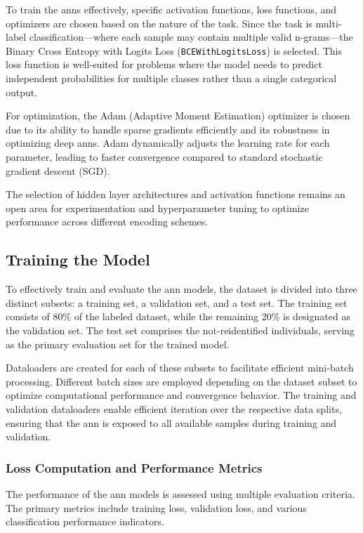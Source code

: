 To train the \ac{ann}s effectively, specific activation functions, loss functions, and optimizers are chosen based on the nature of the task.
Since the task is multi-label classification—where each sample may contain multiple valid n-grams—the Binary Cross Entropy with Logits Loss (\texttt{BCEWithLogitsLoss}) is selected.
This loss function is well-suited for problems where the model needs to predict independent probabilities for multiple classes rather than a single categorical output.

For optimization, the Adam (Adaptive Moment Estimation) optimizer is chosen due to its ability to handle sparse gradients efficiently and its robustness in optimizing deep \ac{ann}s.
Adam dynamically adjusts the learning rate for each parameter, leading to faster convergence compared to standard stochastic gradient descent (SGD).

The selection of hidden layer architectures and activation functions remains an open area for experimentation and hyperparameter tuning to optimize performance across different encoding schemes.

\subsection{Training the Model} \label{sec:training}

To effectively train and evaluate the \ac{ann} models, the dataset is divided into three distinct subsets: a training set, a validation set, and a test set.
The training set consists of 80\% of the labeled dataset, while the remaining 20\% is designated as the validation set.
The test set comprises the not-reidentified individuals, serving as the primary evaluation set for the trained model.

Dataloaders are created for each of these subsets to facilitate efficient mini-batch processing.
Different batch sizes are employed depending on the dataset subset to optimize computational performance and convergence behavior.
The training and validation dataloaders enable efficient iteration over the respective data splits, ensuring that the \ac{ann} is exposed to all available samples during training and validation.

\subsubsection{Loss Computation and Performance Metrics}

The performance of the \ac{ann} models is assessed using multiple evaluation criteria.
The primary metrics include training loss, validation loss, and various classification performance indicators.

